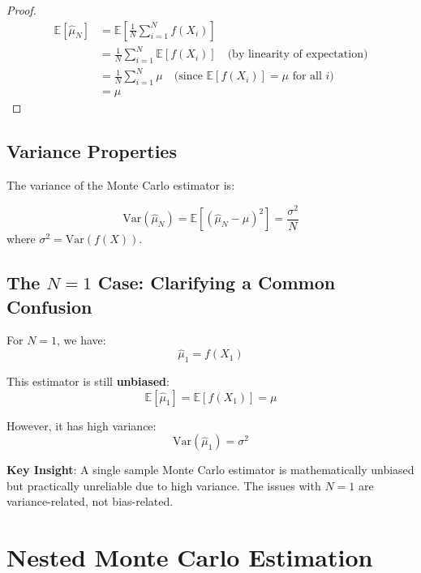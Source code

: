 \begin{notechapter}
\begin{proof}
\begin{align*}
\mathbb{E}[\hat{\mu}_N] &= \mathbb{E}\left[\frac{1}{N} \sum_{i=1}^N f(X_i)\right] \\
&= \frac{1}{N} \sum_{i=1}^N \mathbb{E}[f(X_i)] \quad \text{(by linearity of expectation)} \\
&= \frac{1}{N} \sum_{i=1}^N \mu \quad \text{(since $\mathbb{E}[f(X_i)] = \mu$ for all $i$)} \\
&= \mu
\end{align*}
\end{proof}

\subsection{Variance Properties}

The variance of the Monte Carlo estimator is:

\begin{equation}
\text{Var}(\hat{\mu}_N) = \mathbb{E}[(\hat{\mu}_N - \mu)^2] = \frac{\sigma^2}{N}
\end{equation}
where $\sigma^2 = \text{Var}(f(X))$.

\subsection{The $N=1$ Case: Clarifying a Common Confusion}

For $N=1$, we have:
\begin{equation}
\hat{\mu}_1 = f(X_1)
\end{equation}

This estimator is still \textbf{unbiased}:
\begin{equation}
\mathbb{E}[\hat{\mu}_1] = \mathbb{E}[f(X_1)] = \mu
\end{equation}

However, it has high variance:
\begin{equation}
\text{Var}(\hat{\mu}_1) = \sigma^2
\end{equation}

\textbf{Key Insight}: A single sample Monte Carlo estimator is mathematically unbiased but practically unreliable due to high variance. The issues with $N=1$ are variance-related, not bias-related.

\section{Nested Monte Carlo Estimation}


\end{notechapter}
